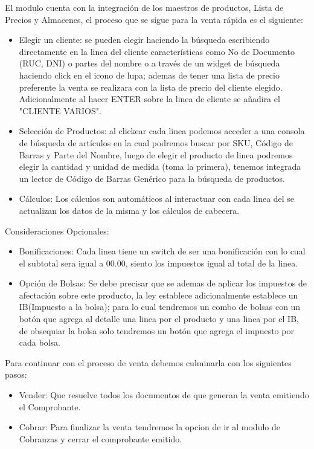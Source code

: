 \documentclass[pdftex,12pt,oneside,a4paper,spanish, english, brazil]{abntex2}
\begin{document}
\begin{sloppypar}
              El modulo cuenta con la integración de los maestros de productos, Lista de Precios y Almacenes, el proceso que se sigue para la venta rápida es el siguiente:
              \begin{itemize}
              	\item Elegir un cliente: se pueden elegir haciendo la búsqueda escribiendo directamente en la linea del cliente características como No de Documento (RUC, DNI) o partes del nombre o a través de un widget de búsqueda haciendo click en el icono de lupa; ademas de tener una lista de precio preferente la venta se realizara con la lista de precio del cliente elegido.\\
              	Adicionalmente al hacer ENTER sobre la linea de cliente
              	se añadira el "CLIENTE VARIOS".
              	\item Selección de Productos: al clickear cada linea podemos acceder a una consola de búsqueda de artículos en la cual podremos buscar por SKU, Código de Barras y Parte del Nombre, luego de elegir el producto de linea podremos elegir la cantidad y unidad de medida (toma la primera), tenemos integrada un lector de Código de Barras Genérico para la búsqueda de productos.
              	\item Cálculos: Los cálculos son automáticos al interactuar con cada linea del se actualizan los datos de la misma y los cálculos de cabecera. 
              \end{itemize}
              Consideraciones Opcionales:
              \begin{itemize}	
              	\item Bonificaciones: Cada linea tiene un switch de ser una bonificación con lo cual el subtotal sera igual a 00.00, siento los impuestos igual al total de la linea.
              	\item Opción de Bolsas: Se debe precisar que se ademas de aplicar los impuestos de afectación sobre este producto, la ley establece adicionalmente establece un IB(Impuesto a la bolsa); para lo cual tendremos un combo de bolsas con un botón que agrega al detalle una linea por el producto y
              	una linea  por el IB, de obsequiar la bolsa solo tendremos un botón que agrega el impuesto
              	por cada bolsa.
              \end{itemize}
              Para continuar con el proceso de venta debemos culminarla con los siguientes pasos:
              \begin{itemize}
              	\item Vender: Que resuelve todos los documentos de que generan la venta emitiendo el Comprobante.
              	\item Cobrar: Para finalizar la venta tendremos la opcion de ir al modulo de Cobranzas y cerrar el comprobante emitido.
              \end{itemize}

\end{sloppypar}
\end{document}
